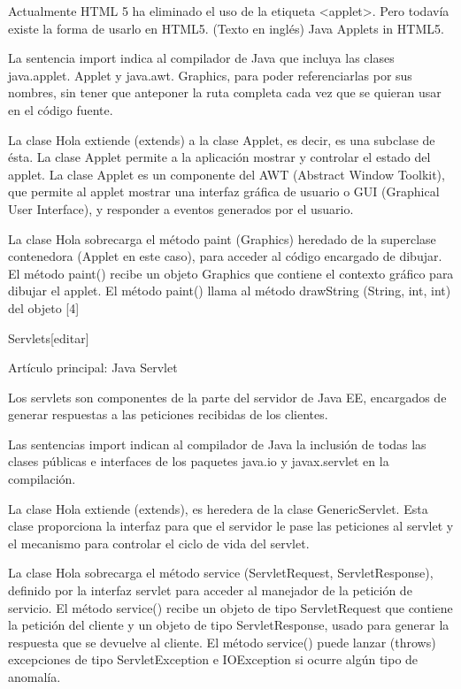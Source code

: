 \documentclass[11pt,a4paper]{$type}
\begin{document}
	\bigskip
							Actualmente HTML 5 ha eliminado el uso de la etiqueta <applet>. Pero todavía existe la forma de usarlo en HTML5. (Texto en inglés) Java Applets in HTML5.
	\bigskip
							
	\bigskip
							La sentencia import indica al compilador de Java que incluya las clases java.applet. Applet y java.awt. Graphics, para poder referenciarlas por sus nombres, sin tener que anteponer la ruta completa cada vez que se quieran usar en el código fuente.
	\bigskip
							
	\bigskip
							La clase Hola extiende (extends) a la clase Applet, es decir, es una subclase de ésta. La clase Applet permite a la aplicación mostrar y controlar el estado del applet. La clase Applet es un componente del AWT (Abstract Window Toolkit), que permite al applet mostrar una interfaz gráfica de usuario o GUI (Graphical User Interface), y responder a eventos generados por el usuario.
	\bigskip
							
	\bigskip
							La clase Hola sobrecarga el método paint (Graphics) heredado de la superclase contenedora (Applet en este caso), para acceder al código encargado de dibujar. El método paint() recibe un objeto Graphics que contiene el contexto gráfico para dibujar el applet. El método paint() llama al método drawString (String, int, int) del objeto [4]
	\bigskip
							
	\bigskip
							Servlets[editar]
	\bigskip
							
	\bigskip
							Artículo principal: Java Servlet
	\bigskip
							
	\bigskip
							Los servlets son componentes de la parte del servidor de Java EE, encargados de generar respuestas a las peticiones recibidas de los clientes.
	\bigskip
							
	\bigskip
							Las sentencias import indican al compilador de Java la inclusión de todas las clases públicas e interfaces de los paquetes java.io y javax.servlet en la compilación.
	\bigskip
							
	\bigskip
							La clase Hola extiende (extends), es heredera de la clase GenericServlet. Esta clase proporciona la interfaz para que el servidor le pase las peticiones al servlet y el mecanismo para controlar el ciclo de vida del servlet.
	\bigskip
							
	\bigskip
							La clase Hola sobrecarga el método service (ServletRequest, ServletResponse), definido por la interfaz servlet para acceder al manejador de la petición de servicio. El método service() recibe un objeto de tipo ServletRequest que contiene la petición del cliente y un objeto de tipo ServletResponse, usado para generar la respuesta que se devuelve al cliente. El método service() puede lanzar (throws) excepciones de tipo ServletException e IOException si ocurre algún tipo de anomalía.
	\bigskip
							
\end{document}
